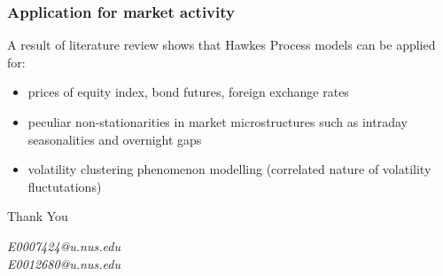 \documentclass{beamer}
\begin{document}
\begin{frame}
\frametitle{Application for market activity}
A result of literature review shows that Hawkes Process models can be applied for:
\begin{itemize}
	\item prices of equity index, bond futures, foreign exchange rates
	\item peculiar non-stationarities in market microstructures such as intraday seasonalities and overnight gaps
	\item volatility clustering phenomenon modelling (correlated nature of volatility fluctutations)
\end{itemize}
\end{frame}

\begin{frame}
\Huge{\centerline{Thank You}}
\begin{center}
\end{center}
\begin{center}
\begin{normalsize}
\emph{E0007424@u.nus.edu}\\
\emph{E0012680@u.nus.edu}
\end{normalsize}
\end{center}
\end{frame}


\end{document}
